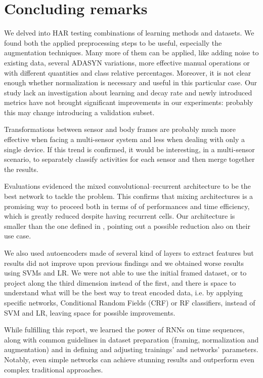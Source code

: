 \section{Concluding remarks}
\label{sec:conclusions}

We delved into HAR testing combinations of learning methods and datasets.
We found both the applied preprocessing steps %
to be useful, especially the augmentation techniques.
Many more of them can be applied, like adding noise to existing data, several ADASYN variations, more effective manual operations or with different quantities and class relative percentages.
Moreover, it is not clear enough whether normalization is necessary and useful in this particular case.
Our study lack an investigation about learning and decay rate and newly introduced metrics have not brought significant improvements in our experiments: probably this may change introducing a validation subset.

Transformations between sensor and body frames are probably much more effective when facing a multi-sensor system and less when dealing with only a single device.
If this trend is confirmed, it would be interesting, in a multi-sensor scenario, to separately classify activities for each sensor and then merge together the results.

Evaluations evidenced the mixed convolutional--recurrent architecture to be the best network to tackle the problem.
This confirms that mixing architectures is a promising way to proceed both in terms of of performances and time efficiency, which is greatly reduced despite having recurrent cells.
Our architecture is smaller than the one defined in \cite{Ordonez-CNN-LSTM}, pointing out a possible reduction also on their use case.%

We also used autoencoders made of several kind of layers to extract features but results did not improve upon previous findings and we obtained worse results using SVMs and LR.
We were not able to use the initial framed dataset, or to project along the third dimension instead of the first, and there is space to understand what will be the best way to treat encoded data, i.e. by applying specific networks, Conditional Random Fields (CRF) or RF classifiers, instead of SVM and LR, leaving space for possible improvements.

While fulfilling this report, we learned the power of RNNs on time sequences, along with common guidelines in dataset preparation (framing, normalization and augmentation) and in defining and adjusting trainings' and networks' parameters.
Notably, even simple networks can achieve stunning results and outperform even complex traditional approaches.%
